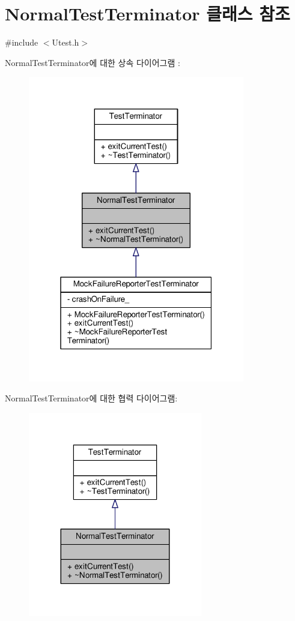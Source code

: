 \hypertarget{class_normal_test_terminator}{}\section{Normal\+Test\+Terminator 클래스 참조}
\label{class_normal_test_terminator}


{\ttfamily \#include $<$Utest.\+h$>$}



Normal\+Test\+Terminator에 대한 상속 다이어그램 \+: 
\nopagebreak
\begin{figure}[H]
\begin{center}
\leavevmode
\includegraphics[width=268pt]{class_normal_test_terminator__inherit__graph}
\end{center}
\end{figure}


Normal\+Test\+Terminator에 대한 협력 다이어그램\+:
\nopagebreak
\begin{figure}[H]
\begin{center}
\leavevmode
\includegraphics[width=215pt]{class_normal_test_terminator__coll__graph}
\end{center}
\end{figure}
